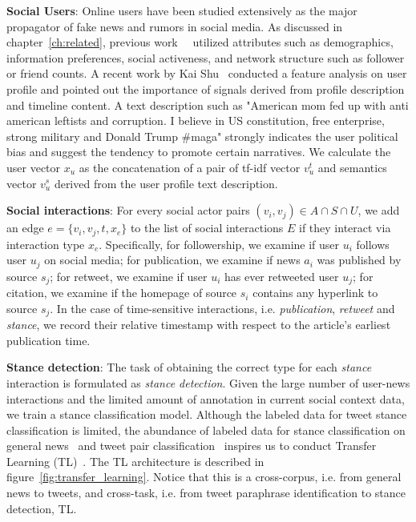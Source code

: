 \documentclass[fyp]{socreport}
\theoremstyle{definition}
\theoremstyle{hypothesis}
\begin{document}
\textbf{Social Users}: Online users have been studied extensively as the major propagator of fake news and rumors in social media. As discussed in chapter~\ref{ch:related}, previous work~\cite{castillo2011information}~\cite{yang2012automatic} utilized attributes  such  as  demographics,  information  preferences,  social activeness, and network structure such as follower or friend counts. A recent work by Kai Shu~\cite{shu2019role} conducted a feature analysis on user profile and pointed out the importance of signals derived from profile description and timeline content. A text description such as "American mom fed up with anti american leftists and corruption. I believe in US constitution, free enterprise, strong military and Donald Trump \#maga" strongly indicates the user political bias and suggest the tendency to promote certain narratives. We calculate the user vector $x_u$ as the concatenation of a pair of tf-idf vector $v^t_u$ and semantics vector $v^s_u$ derived from the user profile text description.

\textbf{Social interactions}: For every social actor pairs $(v_i, v_j)\in A\cap S\cap U$, we add an edge $e=\{v_i, v_j, t, x_e\}$ to the list of social interactions $E$ if they interact via interaction type $x_e$. Specifically, for followership, we examine if user $u_i$ follows user $u_j$ on social media; for publication, we examine if news $a_i$ was published by source $s_j$; for retweet, we examine if user $u_i$ has ever retweeted user $u_j$; for citation, we examine if the homepage of source $s_i$ contains any hyperlink to source $s_j$. In the case of time-sensitive interactions, i.e. \textit{publication}, \textit{retweet} and \textit{stance}, we record their relative timestamp with respect to the article's earliest publication time. 

\textbf{Stance detection}: The task of obtaining the correct type for each \textit{stance} interaction is formulated as \textit{stance detection}. Given the large number of user-news interactions and the limited amount of annotation in current social context data, we train a stance classification model. Although the labeled data for tweet stance classification is limited, the abundance of labeled data for stance classification on general news~\cite{hanselowski2018retrospective} and tweet pair classification~\cite{xu-etal-2015-semeval} inspires us to conduct Transfer Learning (TL)~\cite{pan2009survey}. The TL architecture is described in figure~\ref{fig:transfer_learning}. Notice that this is a cross-corpus, i.e. from general news to tweets, and cross-task, i.e. from tweet paraphrase identification to stance detection, TL.
\end{document}
